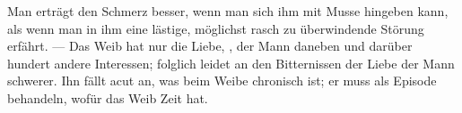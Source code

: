Man erträgt den Schmerz besser, wenn man sich ihm mit Musse hingeben kann, als wenn man in ihm eine lästige, möglichst rasch zu überwindende Störung erfährt. — Das Weib hat nur die Liebe, , der Mann daneben und darüber hundert andere Interessen; folglich leidet an den Bitternissen der Liebe der Mann schwerer. Ihn fällt acut an, was beim Weibe chronisch ist; er muss als Episode behandeln, wofür das Weib Zeit hat.
\par

